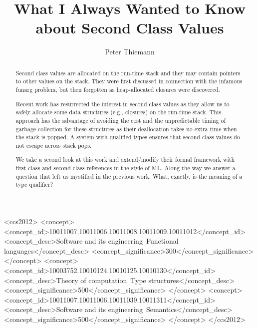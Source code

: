 \documentclass[sigplan,dvipsnames,screen]{acmart}
\begin{document}
\title[What I Always Wanted to Know about Second Class Values]{What I Always Wanted to Know\\about Second Class Values}

\author{Peter Thiemann}

\begin{abstract}
Second class values are allocated on the run-time stack and they may contain pointers
to other values on the stack. They were first discussed in connection with the
infamous funarg problem, but then forgotten as heap-allocated closures were
discovered.

Recent work has resurrected the interest in second class values as they allow us
to safely allocate some data structures (e.g., closures) on the run-time stack.
This approach has the advantage of avoiding the cost and the
unpredictable timing of garbage collection for
these structures as their deallocation takes no extra time when the
stack is popped. 
A system with qualified types ensures that second class values do not
escape across stack pops.

We take a second look at this work and extend/modify their formal framework
with first-class and second-class references in the style of ML. Along
the way we answer a question that left us mystified in the previous
work:  What, exactly, is the meaning of a type qualifier? 
\end{abstract}

\begin{CCSXML}
<ccs2012>
<concept>
<concept_id>10011007.10011006.10011008.10011009.10011012</concept_id>
<concept_desc>Software and its engineering~Functional languages</concept_desc>
<concept_significance>300</concept_significance>
</concept>
<concept>
<concept_id>10003752.10010124.10010125.10010130</concept_id>
<concept_desc>Theory of computation~Type structures</concept_desc>
<concept_significance>500</concept_significance>
</concept>
<concept>
<concept_id>10011007.10011006.10011039.10011311</concept_id>
<concept_desc>Software and its engineering~Semantics</concept_desc>
<concept_significance>500</concept_significance>
</concept>
</ccs2012>
\end{CCSXML}

\end{document}
